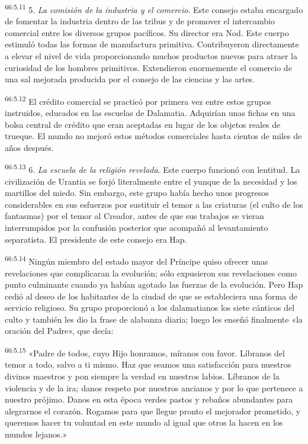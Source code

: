 \par
\textsuperscript{66:5.11} 5. \textit{La comisión de la industria y el comercio}. Este consejo estaba encargado de fomentar la industria dentro de las tribus y de promover el intercambio comercial entre los diversos grupos pacíficos. Su director era Nod. Este cuerpo estimuló todas las formas de manufactura primitiva. Contribuyeron directamente a elevar el nivel de vida proporcionando muchos productos nuevos para atraer la curiosidad de los hombres primitivos. Extendieron enormemente el comercio de una sal mejorada producida por el consejo de las ciencias y las artes.

\par
\textsuperscript{66:5.12} El crédito comercial se practicó por primera vez entre estos grupos instruidos, educados en las escuelas de Dalamatia. Adquirían unas fichas en una bolsa central de crédito que eran aceptadas en lugar de los objetos reales de trueque. El mundo no mejoró estos métodos comerciales hasta cientos de miles de años después.

\par
\textsuperscript{66:5.13} 6. \textit{La escuela de la religión revelada}. Este cuerpo funcionó con lentitud. La civilización de Urantia se forjó literalmente entre el yunque de la necesidad y los martillos del miedo. Sin embargo, este grupo había hecho unos progresos considerables en sus esfuerzos por sustituir el temor a las criaturas (el culto de los fantasmas) por el temor al Creador, antes de que sus trabajos se vieran interrumpidos por la confusión posterior que acompañó al levantamiento separatista. El presidente de este consejo era Hap.

\par
\textsuperscript{66:5.14} Ningún miembro del estado mayor del Príncipe quiso ofrecer unas revelaciones que complicaran la evolución; sólo expusieron sus revelaciones como punto culminante cuando ya habían agotado las fuerzas de la evolución. Pero Hap cedió al deseo de los habitantes de la ciudad de que se estableciera una forma de servicio religioso. Su grupo proporcionó a los dalamatianos los siete cánticos del culto y también les dio la frase de alabanza diaria; luego les enseñó finalmente «la oración del Padre», que decía:

\par
\textsuperscript{66:5.15} «Padre de todos, cuyo Hijo honramos, míranos con favor. Líbranos del temor a todo, salvo a ti mismo. Haz que seamos una satisfacción para nuestros divinos maestros y pon siempre la verdad en nuestros labios. Líbranos de la violencia y de la ira; danos respeto por nuestros ancianos y por lo que pertenece a nuestro prójimo. Danos en esta época verdes pastos y rebaños abundantes para alegrarnos el corazón. Rogamos para que llegue pronto el mejorador prometido, y queremos hacer tu voluntad en este mundo al igual que otros la hacen en los mundos lejanos.»

